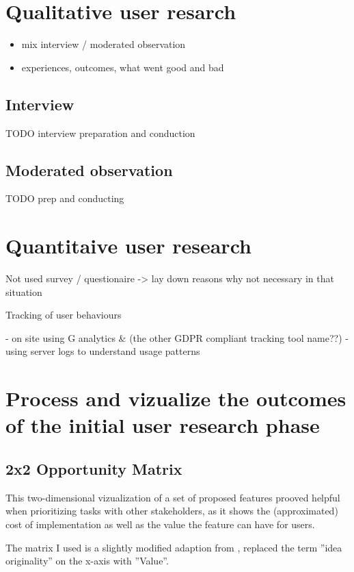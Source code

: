 \section{Qualitative user resarch}

\begin{itemize}
  \item mix interview / moderated observation
  \item experiences, outcomes, what went good and bad
\end{itemize}

\subsection{Interview}

TODO interview preparation and conduction

\subsection{Moderated observation}

TODO prep and conducting

\section{Quantitaive user research}

Not used survey / questionaire -> lay down reasons why not necessary in that situation

Tracking of user behaviours

- on site using G analytics \& (the other GDPR compliant tracking tool name??)
- using server logs to understand usage patterns

\section{Process and vizualize the outcomes of the initial user research phase}

\subsection{2x2 Opportunity Matrix}

This two-dimensional vizualization of a set of proposed features prooved helpful when prioritizing tasks with other stakeholders,
as it shows the (approximated) cost of implementation as well as the value the feature can have for users.

The matrix I used is a slightly modified adaption from \cite[p. 181]{LearnHCI:2020ys}, replaced the term ''idea originality'' on the x-axis with ''Value''.

